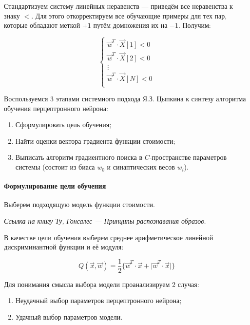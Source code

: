\documentclass{article}
\numberwithin{equation}{subsection}
\begin{document}
Стандартизуем систему линейных неравенств --- приведём все неравенства к знаку $<$. 
Для этого откорректируем все обучающие примеры для тех пар, которые обладают меткой
$+1$ путём домножения их на $-1$. Получим:

\begin{equation}
    \begin{cases}
        \vec{w}^T \cdot \vec{X}[1] < 0 \\
        \vec{w}^T \cdot \vec{X}[2] < 0 \\
        \vdots \\
        \vec{w}^T \cdot \vec{X}[N] < 0 \\
    \end{cases}
    \label{eq:ineq_system}
\end{equation}

Воспользуемся 3 этапами системного подхода Я.З. Цыпкина к синтезу алгоритма обучения
перцептронного нейрона:
\begin{enumerate}
    \item Сформулировать цель обучения;
    \item Найти оценки вектора градиента функции стоимости;
    \item Выписать алгоритм градиентного поиска в $C$-пространстве параметров системы
    (состоит из биаса $w_0$ и синаптических весов $w_i$).
\end{enumerate}




\paragraph{Формулирование цели обучения}

Выберем подходящую модель функции стоимости.

\begin{myquote}
    \textit{Ссылка на книгу Ту, Гонсалес --- Принципы распознавания образов.}
\end{myquote}

В качестве цели обучения выберем среднее арифметическое линейной дискриминантной 
функции и её модуля:

\begin{equation}
    Q(\vec{x}, \vec{w}) = \dfrac{1}{2} \{ \vec{w}^T \cdot \vec{x} + \lvert \vec{w}^T \cdot \vec{x}  \rvert \}
    \label{eq:weight_func_simple}
\end{equation}

Для понимания смысла выбора модели проанализируем 2 случая:
\begin{enumerate}
    \item Неудачный выбор параметров перцептронного нейрона;
    \item Удачный выбор параметров модели.
\end{enumerate}
\end{document}
